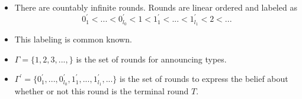 \documentclass[9pt]{beamer}
\begin{document}
\begin{frame}
\begin{center}
\end{center}
\begin{itemize}
\item There are countably infinite  rounds. Rounds are linear ordered and labeled as \[0^{'}_1<...<0^{'}_{l_0}<1<1^{'}_{1}<...<1^{'}_{l_1}<2<...\]
\item This labeling is common known.
\item $\Gamma=\{1,2,3,...,\}$ is the set of rounds for announcing types.
\item $\Gamma^{'}=\{0^{'}_1,...,0^{'}_{l_0},1^{'}_{1},...,1^{'}_{l_1},...\}$ is the set of rounds to express the belief about whether or not this round is the terminal round $T$. 
\end{itemize}
\end{frame}
\end{document}
